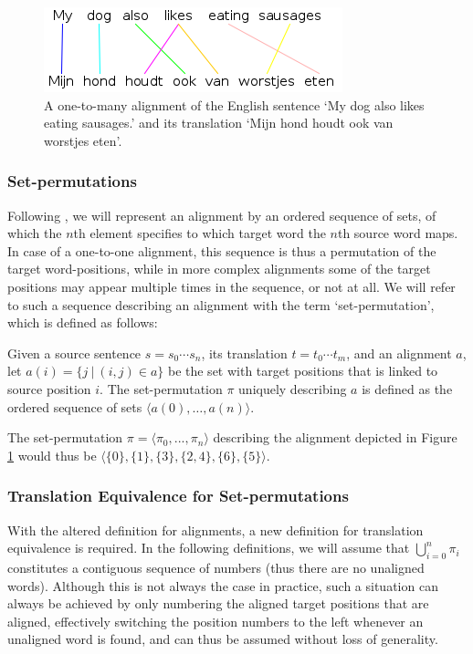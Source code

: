 \begin{figure}
\centering
\includegraphics[scale=0.6]{Graphics/alignment1.png}
\caption{A one-to-many alignment of the English sentence `My dog also likes eating sausages.' and its translation `Mijn hond houdt ook van worstjes eten'. \citep[tool used to create picture: ][]{maillette2010visualizing}
}\label{fig:alignment2}
\end{figure}

\subsubsection{Set-permutations}
Following \cite{simaan2013hats}, we will represent an alignment by an ordered sequence of sets, of which the $n$th element specifies to which target word the $n$th source word maps. In case of a one-to-one alignment, this sequence is thus a permutation of the target word-positions, while in more complex alignments some of the target positions may appear multiple times in the sequence, or not at all. We will refer to such a sequence describing an alignment with the term `set-permutation', which is defined as follows:

\begin{definition}\label{def:sperm}
Given a source sentence $s = s_0 \cdots s_n$, its translation $t = t_0 \cdots t_m$, and an alignment $a$, let $a(i) = \{j~|~(i,j)\in a\}$ be the set with target positions that is linked to source position $i$. The set-permutation $\pi$ uniquely describing $a$ is defined as the ordered sequence of sets
$\langle a(0), \ldots, a(n) \rangle$.
\end{definition}

\noindent The set-permutation $\pi = \langle\pi_0, ..., \pi_n\rangle$ describing the alignment depicted in Figure \ref{fig:alignment2} would thus be $\langle \{0\}, \{1\}, \{3\}, \{2,4\}, \{6\}, \{5\}\rangle$. 

\subsubsection{Translation Equivalence for Set-permutations}

With the altered definition for alignments, a new definition for translation equivalence is required. In the following definitions, we will assume that $\bigcup_{i=0}^{n} \pi_i$ constitutes a contiguous sequence of numbers (thus there are no unaligned words). Although this is not always the case in practice, such a situation can always be achieved by only numbering the aligned target positions that are aligned, effectively switching the position numbers to the left whenever an unaligned word is found, and can thus be assumed without loss of generality.

